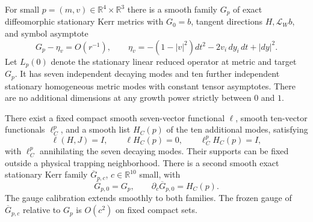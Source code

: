 \begin{proposition}
\label{st:families}
For small $p=(m,v)\in\mathbb R^4\times\mathbb R^3$ there is
a smooth family $G_p$ of exact diffeomorphic stationary Kerr
metrics with $G_0=b$, tangent directions $H,\mathcal L_Wb$,
and symbol asymptote
\begin{equation}\label{st:affine-asymptote}
 G_p-\eta_v=O(r^{-1}),\qquad
 \eta_v=-(1-|v|^2)dt^2-2v_i\,dy_i\,dt+|dy|^2.
\end{equation}
Let $L_p(0)$ denote the stationary linear reduced operator at
metric and target $G_p$.  It has seven independent decaying
modes and ten further independent stationary homogeneous
metric modes with constant tensor asymptotes.  There are no
additional dimensions at any growth power strictly between
$0$ and $1$.

There exist a fixed compact smooth seven-vector functional
$\ell$, smooth ten-vector functionals $\ell_C^p$, and a smooth
list $H_C(p)$ of the ten additional modes, satisfying
\[
 \ell(H,J)=I,\qquad
 \ell H_C(p)=0,\qquad
 \ell_C^p H_C(p)=I,
\]
with $\ell_C^p$ annihilating the seven decaying modes.
Their supports can be fixed outside a physical trapping
neighborhood.  There is a second smooth exact stationary Kerr
family $\overline G_{p,c}$, $c\in\mathbb R^{10}$ small, with
\begin{equation}\label{st:second-family}
 \overline G_{p,0}=G_p,\qquad
 \partial_c\overline G_{p,0}=H_C(p).
\end{equation}
The gauge calibration extends smoothly to both families.
The frozen gauge of $\overline G_{p,c}$ relative to $G_p$
is $O(c^2)$ on fixed compact sets.
\end{proposition}

